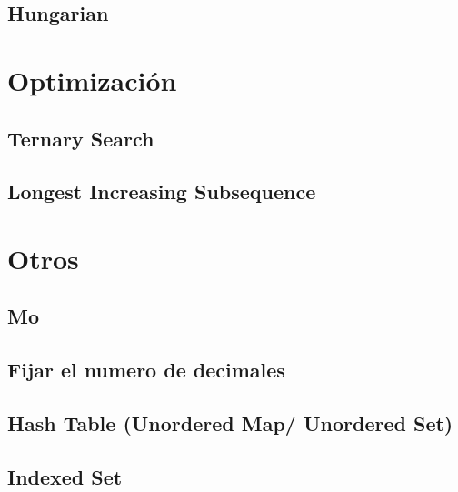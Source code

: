 \documentclass[a4paper,11pt,landscape,twocolumn]{article}
\begin{document}


\subsection{Hungarian}



\section{Optimización}

\subsection{Ternary Search}



\subsection{Longest Increasing Subsequence}



\section{Otros}

\subsection{Mo}



\subsection{Fijar el numero de decimales}



\subsection{Hash Table (Unordered Map/ Unordered Set)}



\subsection{Indexed Set}
\end{document}
